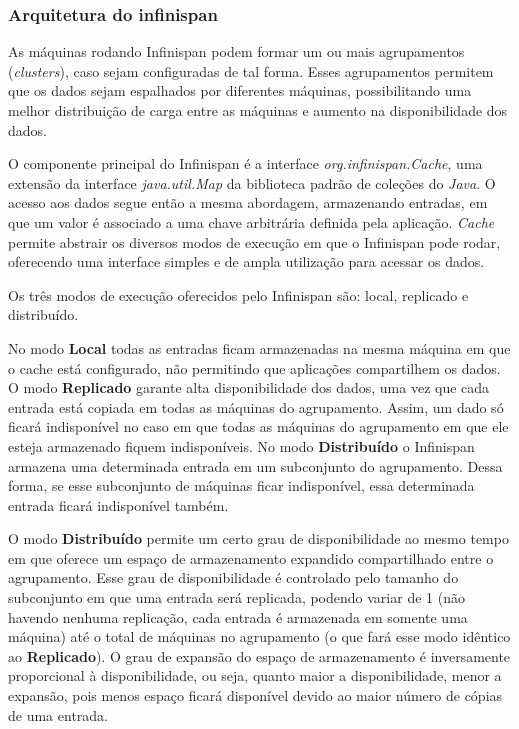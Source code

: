 \documentclass[11pt,twoside,a4paper]{book}
\begin{document}

\subsubsection{Arquitetura do infinispan}
\label{sec:arquitetura_infinispan}
As máquinas rodando Infinispan podem formar um ou mais agrupamentos (\emph{clusters}), caso sejam configuradas de tal forma. Esses agrupamentos permitem que os dados sejam espalhados por diferentes máquinas, possibilitando uma melhor distribuição de carga entre as máquinas e aumento na disponibilidade dos dados.

O componente principal do Infinispan é a interface \emph{org.infinispan.Cache}, uma extensão da interface \emph{java.util.Map} da biblioteca padrão de coleções do \emph{Java}. O acesso aos dados segue então a mesma abordagem, armazenando entradas, em que um valor é associado a uma chave arbitrária definida pela aplicação. \emph{Cache} permite abstrair os diversos modos de execução em que o Infinispan pode rodar, oferecendo uma interface simples e de ampla utilização para acessar os dados.

Os três modos de execução oferecidos pelo Infinispan são: local, replicado e distribuído.

No modo \textbf{Local} todas as entradas ficam armazenadas na mesma máquina em que o cache está configurado, não permitindo que aplicações compartilhem os dados. O modo \textbf{Replicado} garante alta disponibilidade dos dados, uma vez que cada entrada está copiada em todas as máquinas do agrupamento. Assim, um dado só ficará indisponível no caso em que todas as máquinas do agrupamento em que ele esteja armazenado fiquem indisponíveis. No modo \textbf{Distribuído} o Infinispan armazena uma determinada entrada em um subconjunto do agrupamento. Dessa forma, se esse subconjunto de máquinas ficar indisponível, essa determinada entrada ficará indisponível também. 

O modo \textbf{Distribuído} permite um certo grau de disponibilidade ao mesmo tempo em que oferece um espaço de armazenamento expandido compartilhado entre o agrupamento. Esse grau de disponibilidade é controlado pelo tamanho do subconjunto em que uma entrada será replicada, podendo variar de 1 (não havendo nenhuma replicação, cada entrada é armazenada em somente uma máquina) até o total de máquinas no agrupamento (o que fará esse modo idêntico ao \textbf{Replicado}). O grau de expansão do espaço de armazenamento é inversamente proporcional à disponibilidade, ou seja, quanto maior a disponibilidade, menor a expansão, pois menos espaço ficará disponível devido ao maior número de cópias de uma entrada.
\end{document}
